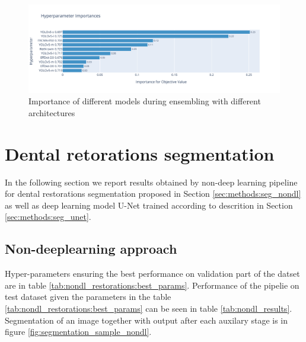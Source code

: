 \begin{figure}
    \centering
    \includegraphics[width=\linewidth]{images/ensemble_all_importance.pdf}
    \caption{Importance of different models during ensembling with different architectures}
    \label{fig:ensembling_parameters_importance}
\end{figure}


\section{Dental retorations segmentation}
In the following section we report results obtained by non-deep learning pipeline for dental restorations segmentation proposed in Section \ref{sec:methods:seg_nondl} as well as deep learning model U-Net trained according to descrition in Section \ref{sec:methods:seg_unet}.
\label{sec:dental_restoration_results}
\subsection{Non-deeplearning approach}
Hyper-parameters ensuring the best performance on validation part of the datset are in table \ref{tab:nondl_restorations:best_params}. Performance of the pipelie on test dataset given the parameters in the table \ref{tab:nondl_restorations:best_params} can be seen in table \ref{tab:nondl_results}. Segmentation of an image together with output after each auxilary stage is in figure \ref{fig:segmentation_sample_nondl}.

